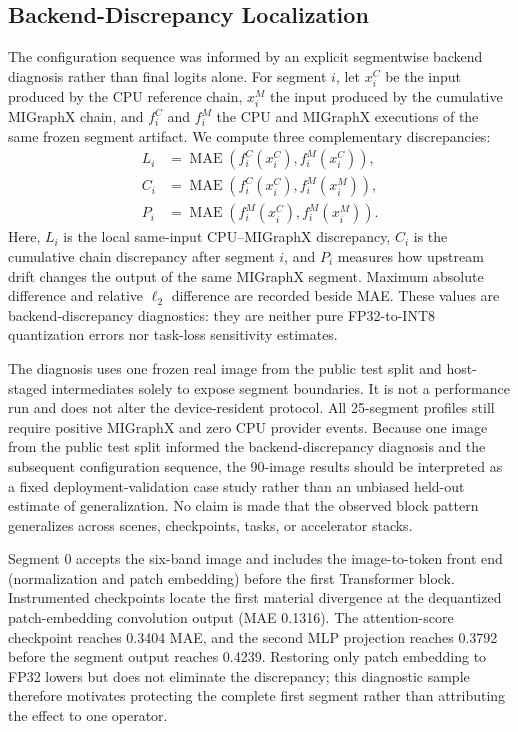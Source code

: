 \documentclass[conference]{IEEEtran}
\begin{document}
\subsection{Backend-Discrepancy Localization}

The configuration sequence was informed by an explicit segmentwise backend diagnosis rather than final logits alone. For segment $i$, let $x_i^{C}$ be the input produced by the CPU reference chain, $x_i^{M}$ the input produced by the cumulative MIGraphX chain, and $f_i^{C}$ and $f_i^{M}$ the CPU and MIGraphX executions of the same frozen segment artifact. We compute three complementary discrepancies:
\begin{equation}
\begin{aligned}
L_i &= \operatorname{MAE}\!\left(f_i^{C}(x_i^{C}),f_i^{M}(x_i^{C})\right),\\
C_i &= \operatorname{MAE}\!\left(f_i^{C}(x_i^{C}),f_i^{M}(x_i^{M})\right),\\
P_i &= \operatorname{MAE}\!\left(f_i^{M}(x_i^{C}),f_i^{M}(x_i^{M})\right).
\end{aligned}
\label{eq:localization}
\end{equation}
Here, $L_i$ is the local same-input CPU--MIGraphX discrepancy, $C_i$ is the cumulative chain discrepancy after segment $i$, and $P_i$ measures how upstream drift changes the output of the same MIGraphX segment. Maximum absolute difference and relative $\ell_2$ difference are recorded beside MAE. These values are backend-discrepancy diagnostics: they are neither pure FP32-to-INT8 quantization errors nor task-loss sensitivity estimates.

The diagnosis uses one frozen real image from the public test split and host-staged intermediates solely to expose segment boundaries. It is not a performance run and does not alter the device-resident protocol. All 25-segment profiles still require positive MIGraphX and zero CPU provider events. Because one image from the public test split informed the backend-discrepancy diagnosis and the subsequent configuration sequence, the 90-image results should be interpreted as a fixed deployment-validation case study rather than an unbiased held-out estimate of generalization. No claim is made that the observed block pattern generalizes across scenes, checkpoints, tasks, or accelerator stacks.

Segment 0 accepts the six-band image and includes the image-to-token front end (normalization and patch embedding) before the first Transformer block. Instrumented checkpoints locate the first material divergence at the dequantized patch-embedding convolution output (MAE 0.1316). The attention-score checkpoint reaches 0.3404 MAE, and the second MLP projection reaches 0.3792 before the segment output reaches 0.4239. Restoring only patch embedding to FP32 lowers but does not eliminate the discrepancy; this diagnostic sample therefore motivates protecting the complete first segment rather than attributing the effect to one operator.
\end{document}
